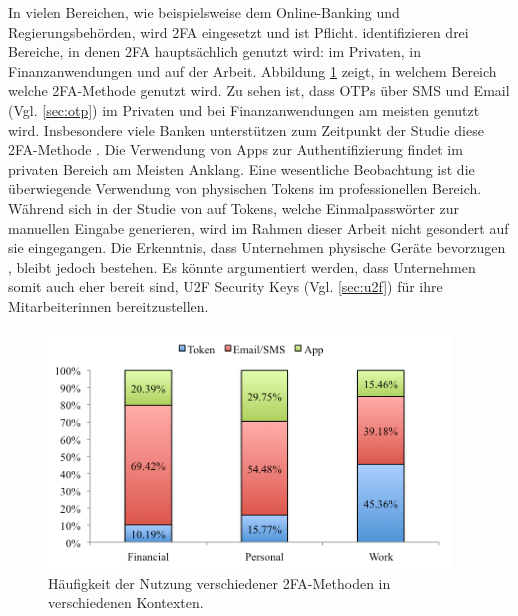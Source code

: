 \pskip
In vielen Bereichen, wie beispielsweise dem Online-Banking und Regierungsbehörden, wird \ac{2FA} eingesetzt und ist Pflicht. \textcite{decristofaroComparativeUsability2014} identifizieren drei Bereiche, in denen \ac{2FA} hauptsächlich genutzt wird: im Privaten, in Finanzanwendungen und auf der Arbeit. Abbildung \ref{fig:use} zeigt, in welchem Bereich welche \ac{2FA}-Methode genutzt wird. Zu sehen ist, dass \acp{OTP} über SMS und Email (Vgl. \ref{sec:otp}) im Privaten und bei Finanzanwendungen am meisten genutzt wird. Insbesondere viele Banken unterstützen zum Zeitpunkt der Studie diese \ac{2FA}-Methode \parencite{decristofaroComparativeUsability2014}. Die Verwendung von Apps zur Authentifizierung findet im privaten Bereich am Meisten Anklang. Eine wesentliche Beobachtung ist die überwiegende Verwendung von physischen Tokens im professionellen Bereich. Während sich in der Studie von \textcite{decristofaroComparativeUsability2014} auf Tokens, welche Einmalpasswörter zur manuellen Eingabe generieren, wird im Rahmen dieser Arbeit nicht gesondert auf sie eingegangen. Die Erkenntnis, dass Unternehmen physische Geräte bevorzugen \parencite{decristofaroComparativeUsability2014}, bleibt jedoch bestehen. Es könnte argumentiert werden, dass Unternehmen somit auch eher bereit sind, \acs{U2F} Security Keys (Vgl. \ref{sec:u2f}) für ihre Mitarbeiterinnen bereitzustellen.

\begin{figure}
  \begin{center}
    \includegraphics[width=0.95\textwidth]{assets/use.png}
  \end{center}
  \caption[Häufigkeit der Nutzung verschiedener \acs{2FA}-Methoden]{Häufigkeit der Nutzung verschiedener \acs{2FA}-Methoden in verschiedenen Kontexten.\\\parencite[6]{decristofaroComparativeUsability2014}}
  \label{fig:use}
\end{figure}



